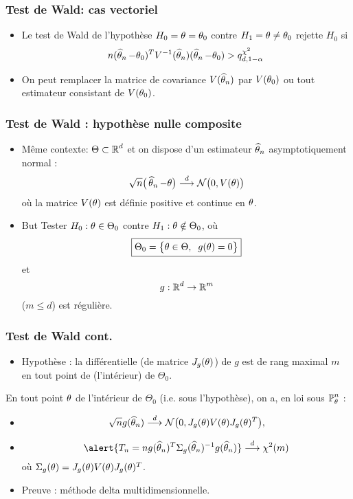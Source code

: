 \begin{frame}
\frametitle{Test de Wald: cas vectoriel}
\begin{itemize}
\item Le test de Wald de l'hypothèse $H_0= \theta= \theta_0$ contre $H_1= \theta \ne \theta_0$
rejette $H_0$ si
\[
n (\operatorname{\widehat \theta_{\mathnormal{n}}} - \theta_0)^T V^{-1}(\operatorname{\widehat \theta_{\mathnormal{n}}}) (\operatorname{\widehat \theta_{\mathnormal{n}}} - \theta_0) > q^{\chi^2}_{d,1-\alpha} \,
\]
\item On peut remplacer la matrice de covariance $V(\operatorname{\widehat \theta_{\mathnormal{n}}})$ par $V(\theta_0)$ ou tout estimateur consistant de $V(\theta_0)$.
\end{itemize}
\end{frame}

\begin{frame}
\frametitle{Test de Wald : hypothèse nulle composite}
\begin{itemize}
\item \alert{ Même contexte:} $\Theta \subset \operatorname{{\mathbb R}}^d$ et \alert{on dispose} d'un estimateur $\operatorname{\widehat \theta_{\mathnormal{n}}}$ asymptotiquement normal :
$$\sqrt{n}\big(\operatorname{\widehat \theta_{\mathnormal{n}}}-\theta\big)\stackrel{d}{\longrightarrow} {\mathcal N}\big(0, V(\theta)\big)$$
où la matrice $V(\theta)$ est \alert{définie positive} et continue en $\theta$.
\item \alert{But} Tester $H_0: \theta \in \Theta_0$ contre $H_1:\theta \notin \Theta_0$, où
$$\boxed{\Theta_0 = \big\{\theta \in \Theta,\;\;g(\theta) = 0\big\}}$$
et
$$g:\operatorname{{\mathbb R}}^d \rightarrow \operatorname{{\mathbb R}}^m$$
($m \leq d$) est régulière.
\end{itemize}
\end{frame}




\begin{frame}
\frametitle{Test de Wald cont.}
\begin{itemize}
\item \alert{Hypothèse : } la différentielle (de matrice $J_g(\theta)$) de $g$ est de rang maximal $m$ en tout point de (l'intérieur) de $\Theta_0$.
\end{itemize}
\begin{prop}
En tout point $\theta$ de l'intérieur de $\Theta_0$ (i.e. \alert{sous l'hypothèse}), on a, en loi sous $\operatorname{{\mathbb P}}_\theta^n$ :
\begin{itemize}
\item $$\sqrt{n}g(\operatorname{\widehat \theta_{\mathnormal{n}}}) \stackrel{d}{\longrightarrow} {\mathcal N}\big(0, J_g(\theta)V(\theta)J_g(\theta)^T\big),$$
\item $$\alert{T_n=ng(\est)^T\Sigma_g(\est)^{-1}g(\est)} \stackrel{d}{\longrightarrow} \chi^2(m)$$
où $\Sigma_g(\theta) =J_g(\theta) V(\theta) J_g(\theta)^T$.
\end{itemize}
\end{prop}
\begin{itemize}
\item Preuve : méthode  delta  multidimensionnelle.
\end{itemize}
\end{frame}

